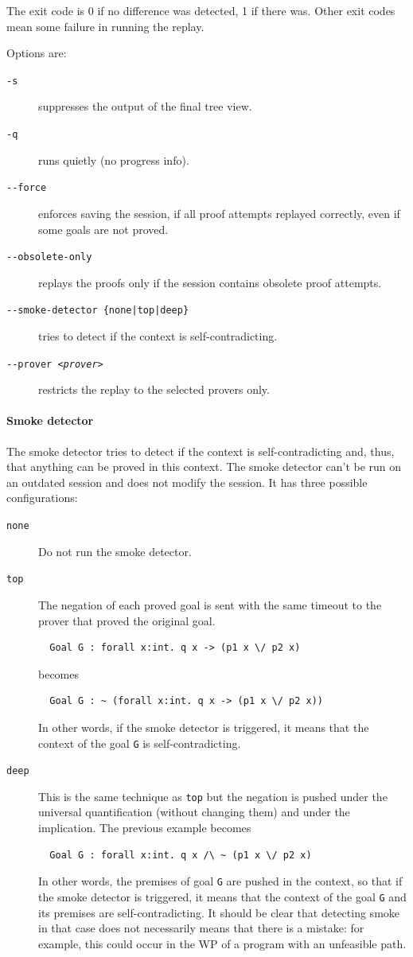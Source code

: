 The exit code is 0 if no difference was detected, 1 if there
was. Other exit codes mean some failure in running the replay.

Options are:
\begin{description}
\item[\texttt{-s}] suppresses the output of the final tree view.
\item[\texttt{-q}] runs quietly (no progress info).
\item[\texttt{-{}-force}] enforces saving the session, if all proof
  attempts replayed correctly, even if some goals are not proved.
\item[\texttt{-{}-obsolete-only}] replays the proofs only if the session
  contains obsolete proof attempts.
\item[\texttt{-{}-smoke-detector \{none|top|deep\}}] tries to detect
  if the context is self-contradicting.
\item[\texttt{-{}-prover \textsl{<prover>}}] restricts the replay to the
  selected provers only.
\end{description}

\paragraph{Smoke detector}

The smoke detector tries to detect if the context is
self-contradicting and, thus, that anything can be proved in this
context. The smoke detector can't be run on an outdated session and does
not modify the session.  It has three possible configurations:
\begin{description}
\item[\texttt{none}] Do not run the smoke detector.
\item[\texttt{top}] The negation of each proved goal is sent with the
  same timeout to the prover that proved the original goal.
\begin{verbatim}
  Goal G : forall x:int. q x -> (p1 x \/ p2 x)
\end{verbatim}
  becomes
\begin{verbatim}
  Goal G : ~ (forall x:int. q x -> (p1 x \/ p2 x))
\end{verbatim}
  In other words, if the smoke detector is triggered, it means that the context
  of the goal \texttt{G} is self-contradicting.
\item[\texttt{deep}] This is the same technique as \texttt{top} but
  the negation is pushed under the universal quantification (without
  changing them) and under the implication. The previous example
  becomes
\begin{verbatim}
  Goal G : forall x:int. q x /\ ~ (p1 x \/ p2 x)
\end{verbatim}
  In other words, the premises of goal \texttt{G} are pushed in the
  context, so that if the smoke detector is triggered, it means that
  the context of the goal \texttt{G} and its premises are
  self-contradicting. It should be clear that detecting smoke in that
  case does not necessarily means that there is a mistake: for
  example, this could occur in the WP of a program with an unfeasible
  path.
\end{description}

